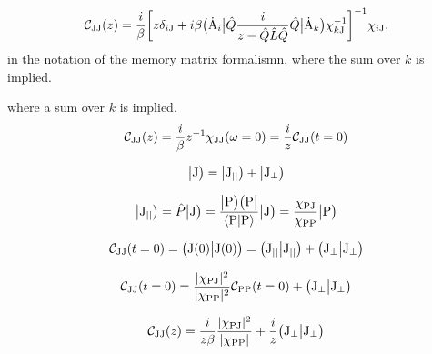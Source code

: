 %
\begin{align}
	\mathcal{C}_{\mathrm{JJ}}(z) = 
		\frac{i}{\beta} \bigg[ 
			z \delta_{i\mathrm{J}} 
			+ 
			i \beta 
			\big({\dot{\mathrm{A}}_{i}}\big| 
			\hat{Q} \frac{i}{z - \hat{Q} \hat{L} \hat{Q}} \hat{Q} 
			\big|{\dot{\mathrm{A}}_{k}}\big)
			\chi_{k\mathrm{J}}^{-1}
		\bigg]^{-1}
		\chi_{i\mathrm{J}},
\end{align}
%
in the notation of the memory matrix formalismn, where the sum over $k$ is implied.


where a sum over $k$ is implied.
%
\begin{align}
	\mathcal{C}_{\mathrm{JJ}}(z) = \frac{i}{\beta} z^{-1} \chi_{\mathrm{JJ}}(\omega=0) = \frac{i}{z} \mathcal{C}_{\mathrm{JJ}}(t=0)
\end{align}
%

%
\begin{align}
	\big|{\mathrm{J}}\big) = \big|{\mathrm{J}_{\mid\mid}}\big) + \big|{\mathrm{J}_{\bot}}\big)
\end{align}
%

%
\begin{align}
	\oket{\mt{J}_{\mid\mid}} = \hat{P}\oket{\mt{J}} = \frac{\odyad{\mt{P}}{\mt{P}}}{\braket{\mt{P}}{\mt{P}}} \oket{\mt{J}} = \frac{\chi_{\mt{PJ}}}{\chi_{\mt{PP}}} \oket{\mt{P}}
\end{align}
%

%
\begin{align}
	\mathcal{C}_{\mathrm{JJ}}(t=0) = \big({\mathrm{J}(0)}\big|{\mathrm{J}(0)}\big) = \big({\mathrm{J}_{\mid\mid}}\big|{\mathrm{J}_{\mid\mid}}\big) + \big({\mathrm{J}_{\bot}}\big|{\mathrm{J}_{\bot}}\big)
\end{align}
%

%
\begin{align}
	\mathcal{C}_{\mathrm{JJ}}(t=0) = \frac{\vert\chi_{\mathrm{PJ}}\vert^{2}}{\vert\chi_{\mathrm{PP}}\vert^{2}} \mathcal{C}_{\mathrm{PP}}(t=0) + \big({\mathrm{J}_{\bot}}\big|{\mathrm{J}_{\bot}}\big)
\end{align}
%

%
\begin{align}
	\mathcal{C}_{\mathrm{JJ}}(z) = \frac{i}{z \beta} \frac{\vert\chi_{\mathrm{PJ}}\vert^{2}}{\vert\chi_{\mathrm{PP}}\vert} + \frac{i}{z} \big({\mathrm{J}_{\bot}}\big|{\mathrm{J}_{\bot}}\big)
\end{align}
%

